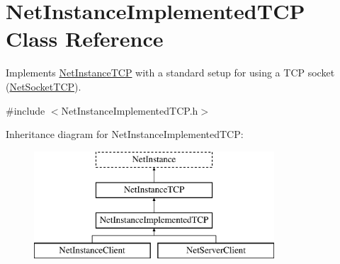 \hypertarget{class_net_instance_implemented_t_c_p}{
\section{NetInstanceImplementedTCP Class Reference}
\label{class_net_instance_implemented_t_c_p}
}


Implements \hyperlink{class_net_instance_t_c_p}{NetInstanceTCP} with a standard setup for using a TCP socket (\hyperlink{class_net_socket_t_c_p}{NetSocketTCP}).  




{\ttfamily \#include $<$NetInstanceImplementedTCP.h$>$}

Inheritance diagram for NetInstanceImplementedTCP:\begin{figure}[H]
\begin{center}
\leavevmode
\includegraphics[height=4.000000cm]{class_net_instance_implemented_t_c_p}
\end{center}
\end{figure}

